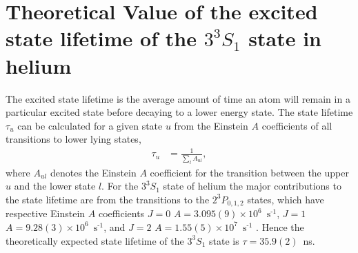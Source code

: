 \documentclass[%
 amsmath,amssymb,
aps,
]{revtex4-2}
\newcommand{\UpperState}{3^{3\!}S_1}%
\newcommand{\MidState}{2^{3\!}P_{0,1,2}}%
\begin{document}



\section{Theoretical Value of the excited state lifetime of the \(\UpperState\) state in helium}
The excited state lifetime is the average amount of time an atom will remain in a particular excited state before decaying to a lower energy state. The state lifetime \(\tau_u\) can be calculated for a given state \(u\) from the Einstein \(A\) coefficients of all transitions to lower lying states,
\begin{align}
    \tau_u &= \frac{1}{\sum_l A_{ul}},
\end{align}
where \(A_{ul}\) denotes the Einstein \(A\) coefficient for the transition between the upper \(u\) and the lower state \(l\). For the \(\UpperState\) state of helium the major contributions to the state lifetime are from the transitions to the \(\MidState\) states, which have respective Einstein \(A\) coefficients \(J=0\) \(A = 3.095(9)\times 10^{6}\)~\(\text{s}^{\text{-}1}\), \(J=1\) \(A = 9.28(3)\times 10^{6}\)~\(\text{s}^{\text{-}1}\), and \(J=2\) \(A = 1.55(5)\times 10^{7}\)~\(\text{s}^{\text{-}1}\) \cite{NISTASD}. Hence the theoretically expected state lifetime of the \(\UpperState\) state is \(\tau = 35.9(2)\)~ns.
\end{document}

